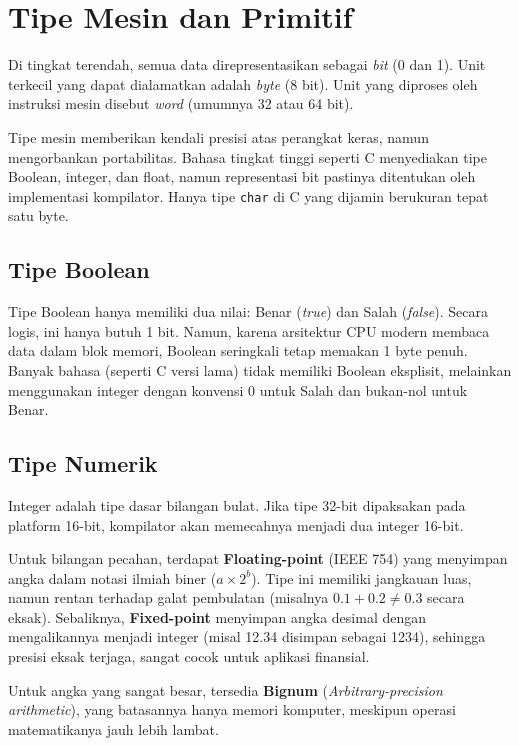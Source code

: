 \documentclass[11pt,a4paper]{article}
\begin{document}
	\section{Tipe Mesin dan Primitif}
	
	Di tingkat terendah, semua data direpresentasikan sebagai \textit{bit} (0 dan 1). Unit terkecil yang dapat dialamatkan adalah \textit{byte} (8 bit). Unit yang diproses oleh instruksi mesin disebut \textit{word} (umumnya 32 atau 64 bit). 
	
	Tipe mesin memberikan kendali presisi atas perangkat keras, namun mengorbankan portabilitas. Bahasa tingkat tinggi seperti C menyediakan tipe Boolean, integer, dan float, namun representasi bit pastinya ditentukan oleh implementasi kompilator. Hanya tipe \texttt{char} di C yang dijamin berukuran tepat satu byte.
	
	\subsection{Tipe Boolean}
	Tipe Boolean hanya memiliki dua nilai: Benar (\textit{true}) dan Salah (\textit{false}). Secara logis, ini hanya butuh 1 bit. Namun, karena arsitektur CPU modern membaca data dalam blok memori, Boolean seringkali tetap memakan 1 byte penuh. Banyak bahasa (seperti C versi lama) tidak memiliki Boolean eksplisit, melainkan menggunakan integer dengan konvensi 0 untuk Salah dan bukan-nol untuk Benar.
	
	\subsection{Tipe Numerik}
	Integer adalah tipe dasar bilangan bulat. Jika tipe 32-bit dipaksakan pada platform 16-bit, kompilator akan memecahnya menjadi dua integer 16-bit. 
	
	Untuk bilangan pecahan, terdapat \textbf{Floating-point} (IEEE 754) yang menyimpan angka dalam notasi ilmiah biner ($a \times 2^b$). Tipe ini memiliki jangkauan luas, namun rentan terhadap galat pembulatan (misalnya $0.1 + 0.2 \neq 0.3$ secara eksak). Sebaliknya, \textbf{Fixed-point} menyimpan angka desimal dengan mengalikannya menjadi integer (misal 12.34 disimpan sebagai 1234), sehingga presisi eksak terjaga, sangat cocok untuk aplikasi finansial.
	
	Untuk angka yang sangat besar, tersedia \textbf{Bignum} (\textit{Arbitrary-precision arithmetic}), yang batasannya hanya memori komputer, meskipun operasi matematikanya jauh lebih lambat.
	
\end{document}
